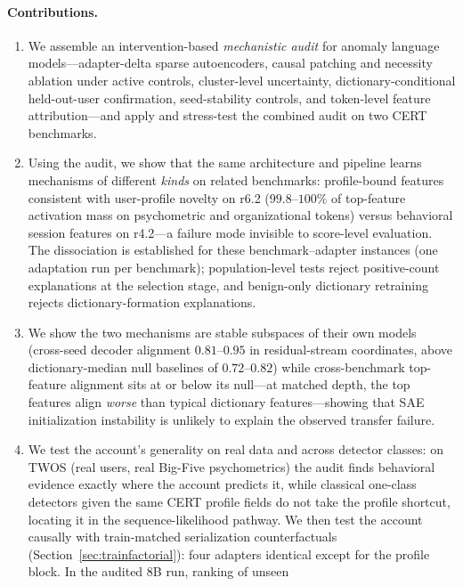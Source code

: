 \documentclass[10pt]{article} %
\newcommand{\rsix}{r6.2}
\newcommand{\rfour}{r4.2}
\begin{document}


\paragraph{Contributions.}
\begin{enumerate}[leftmargin=1.3em]
\item We assemble an intervention-based \emph{mechanistic audit} for anomaly
language models---adapter-delta sparse autoencoders, causal patching and
necessity ablation under active controls, cluster-level uncertainty,
dictionary-conditional held-out-user confirmation, seed-stability controls, and token-level feature
attribution---and apply and stress-test the combined audit on two CERT benchmarks.
\item Using the audit, we show that the same architecture and pipeline learns
mechanisms of different \emph{kinds} on related benchmarks: profile-bound
features consistent with user-profile novelty on \rsix{} ($99.8$--$100\%$ of top-feature activation mass on
psychometric and organizational tokens) versus behavioral session features on
\rfour{}---a failure mode invisible to score-level evaluation. The
dissociation is established for these benchmark--adapter instances (one
adaptation run per benchmark); population-level tests reject positive-count
explanations at the selection stage, and benign-only dictionary retraining
rejects dictionary-formation explanations.
\item We show the two mechanisms are stable subspaces of their own models
(cross-seed decoder alignment $0.81$--$0.95$ in residual-stream
coordinates, above dictionary-median null baselines of $0.72$--$0.82$)
while cross-benchmark top-feature alignment sits at or below its null---at
matched depth, the top features align \emph{worse} than typical dictionary
features---showing that SAE initialization instability is unlikely to
explain the observed transfer failure.
\item We test the account's generality on real data and across detector
classes: on TWOS (real users, real Big-Five psychometrics) the audit
finds behavioral evidence exactly where the account predicts it, while
classical one-class detectors given the same CERT profile fields do not
take the profile shortcut, locating it in the sequence-likelihood pathway.
We then test the account causally with train-matched serialization
counterfactuals (Section~\ref{sec:trainfactorial}): four adapters identical
except for the profile block. In the audited $8$B run, ranking of unseen

\end{enumerate}
\end{document}
